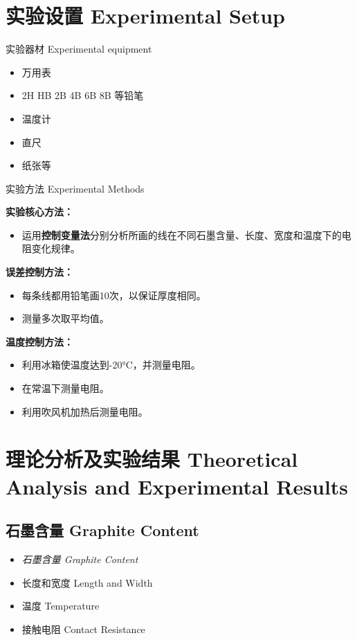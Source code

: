 \documentclass[10pt]{beamer}
\begin{document}
	\section[实验设置 Experimental Setup]{实验设置 Experimental Setup}
	\begin{frame}{实验器材 Experimental equipment}
		\begin{itemize}
			\item 万用表
			\item 2H HB 2B 4B 6B 8B 等铅笔
			\item 温度计
			\item 直尺
			\item 纸张等
		\end{itemize}
	\end{frame}
	
	
	\begin{frame}{实验方法 Experimental Methods}
		

			\textbf{实验核心方法：}
			\begin{itemize}
			\item 运用\textbf{控制变量法}分别分析所画的线在不同石墨含量、长度、宽度和温度下的电阻变化规律。\bigskip
			\end{itemize}
	
		\bigskip
	\textbf{误差控制方法：}
	\begin{itemize}
	\item 每条线都用铅笔画10次，以保证厚度相同。
	\item 测量多次取平均值。
\end{itemize}\bigskip

\textbf{温度控制方法：}
		\begin{itemize}
			\item 利用冰箱使温度达到-20°C，并测量电阻。
			\item 在常温下测量电阻。
			\item 利用吹风机加热后测量电阻。
		\end{itemize}
	\end{frame}
	
	
	\section{理论分析及实验结果 Theoretical Analysis and Experimental Results }
	\subsection{石墨含量 Graphite Content}
	
	
	\begin{frame}%
		\begin{itemize}
			\item {\LARGE \textit{石墨含量 Graphite Content}}
			\item 长度和宽度 Length and Width
			
			\item 温度 Temperature
			\item 接触电阻 Contact Resistance
		\end{itemize}
	\end{frame}
	
\end{document}
